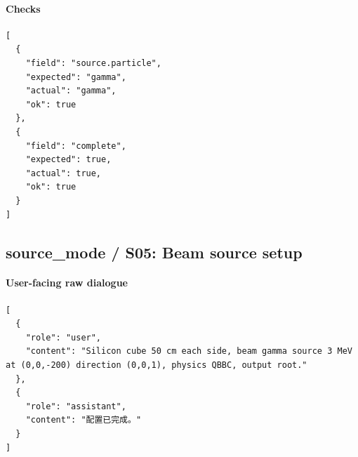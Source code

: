 \documentclass[11pt]{ctexart}
\begin{document}
\paragraph{Checks}
\begin{lstlisting}
[
  {
    "field": "source.particle",
    "expected": "gamma",
    "actual": "gamma",
    "ok": true
  },
  {
    "field": "complete",
    "expected": true,
    "actual": true,
    "ok": true
  }
]
\end{lstlisting}
\subsection{source\_mode / S05: Beam source setup}
\paragraph{User-facing raw dialogue}
\begin{lstlisting}
[
  {
    "role": "user",
    "content": "Silicon cube 50 cm each side, beam gamma source 3 MeV at (0,0,-200) direction (0,0,1), physics QBBC, output root."
  },
  {
    "role": "assistant",
    "content": "配置已完成。"
  }
]
\end{lstlisting}
\end{document}
